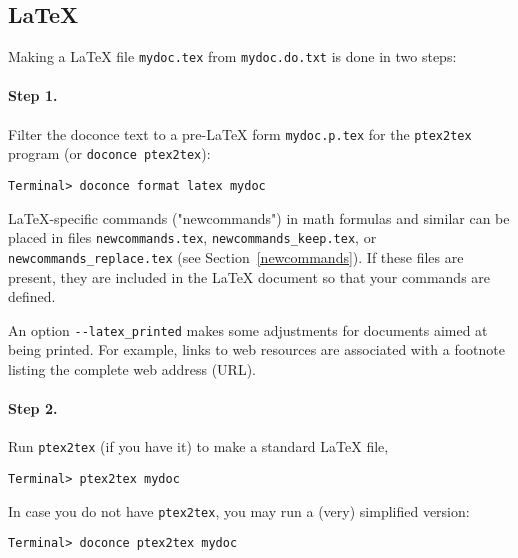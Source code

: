 \documentclass[%
oneside,                 %
final,                   %
10pt]{article}
\begin{document}
\subsection{{\LaTeX}}

Making a {\LaTeX} file {\fontsize{10pt}{10pt}\Verb!mydoc.tex!} from {\fontsize{10pt}{10pt}\Verb!mydoc.do.txt!} is done in two steps:

\paragraph{Step 1.}
Filter the doconce text to a pre-LaTeX form {\fontsize{10pt}{10pt}\Verb!mydoc.p.tex!} for
the {\fontsize{10pt}{10pt}\Verb!ptex2tex!} program (or {\fontsize{10pt}{10pt}\Verb!doconce ptex2tex!}):
\vspace{4pt}
\begin{Verbatim}[numbers=none,frame=lines,label=\fbox{{\tiny Terminal}},fontsize=\fontsize{9pt}{9pt},
labelposition=topline,framesep=2.5mm,framerule=0.7pt]
Terminal> doconce format latex mydoc
\end{Verbatim}
LaTeX-specific commands ("newcommands") in math formulas and similar
can be placed in files {\fontsize{10pt}{10pt}\Verb!newcommands.tex!}, {\fontsize{10pt}{10pt}\Verb!newcommands_keep.tex!}, or
{\fontsize{10pt}{10pt}\Verb!newcommands_replace.tex!} (see Section~\ref{newcommands}).
If these files are present, they are included in the {\LaTeX} document
so that your commands are defined.

An option {\fontsize{10pt}{10pt}\Verb!--latex_printed!} makes some adjustments for documents
aimed at being printed. For example, links to web resources are
associated with a footnote listing the complete web address (URL).

\paragraph{Step 2.}
Run {\fontsize{10pt}{10pt}\Verb!ptex2tex!} (if you have it) to make a standard {\LaTeX} file,
\vspace{4pt}
\begin{Verbatim}[numbers=none,frame=lines,label=\fbox{{\tiny Terminal}},fontsize=\fontsize{9pt}{9pt},
labelposition=topline,framesep=2.5mm,framerule=0.7pt]
Terminal> ptex2tex mydoc
\end{Verbatim}
In case you do not have {\fontsize{10pt}{10pt}\Verb!ptex2tex!}, you may run a (very) simplified version:
\vspace{4pt}
\begin{Verbatim}[numbers=none,frame=lines,label=\fbox{{\tiny Terminal}},fontsize=\fontsize{9pt}{9pt},
labelposition=topline,framesep=2.5mm,framerule=0.7pt]
Terminal> doconce ptex2tex mydoc
\end{Verbatim}
\end{document}
